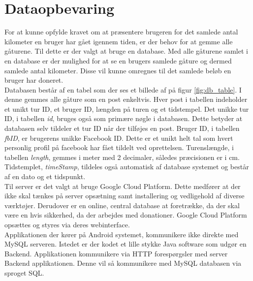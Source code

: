 \section{Dataopbevaring}
For at kunne opfylde kravet om at præsentere brugeren for det samlede antal kilometer en bruger har gået igennem tiden, er der behov for at gemme alle gåturene. Til dette er der valgt at bruge en database. Med alle gåturene samlet i en database er der mulighed for at se en brugers samlede gåture og dermed samlede antal kilometer. Disse vil kunne omregnes til det samlede beløb en bruger har doneret.\\
%
%
Databasen består af en tabel som der ses et billede af på figur \ref{fig:db_table}. I denne gemmes alle gåture som en post enkeltvis. Hver post i tabellen indeholder et unikt tur ID, et bruger ID, længden på turen og et tidstempel.
Det unikke tur ID, i tabellen \emph{id}, bruges også som primære nøgle i databasen. Dette betyder at databasen selv tildeler et tur ID når der tilføjes en post. Bruger ID, i tabellen \emph{fbID}, er brugerens unikke Facebook ID. Dette er et unikt helt tal som hvert personlig profil på facebook har fået tildelt ved oprettelsen. Turenslængde, i tabellen \emph{length}, gemmes i meter med 2 decimaler, således præcisionen er i cm. Tidstemplet, \emph{timeStamp}, tildeles også automatisk af database systemet og består af en dato og et tidspunkt.\\

Til server er det valgt at bruge Google Cloud Platform. Dette medfører at der ikke skal tænkes på server opsætning samt installering og vedligehold af diverse værktøjer. Derudover er en online, central database at foretrække, da der skal være en hvis sikkerhed, da der arbejdes med donationer.
Google Cloud Platform opsættes og styres via deres webinterface.\\
Applikationen der kører på Android systemet, kommunikere ikke direkte med MySQL serveren. Istedet er der kodet et lille stykke Java software som udgør en Backend. Applikationen kommunikere via HTTP forespørgsler med server Backend applikationen. Denne vil så kommunikere med MySQL databasen via sproget SQL.